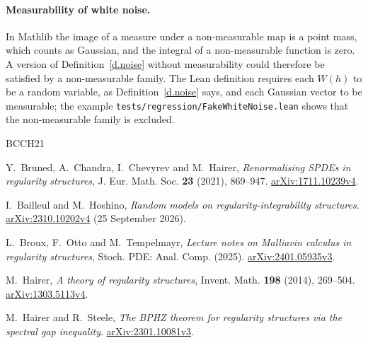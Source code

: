 \documentclass[11pt,letterpaper]{article}
\numberwithin{equation}{section}
\theoremstyle{plain}
\theoremstyle{definition}
\theoremstyle{remark}
\newcommand{\1}{\mathbf{1}}
\begin{document}
\paragraph{Measurability of white noise.} In Mathlib the image of a measure under a non-measurable map is a point mass, which counts as Gaussian, and the integral of a non-measurable function is zero. A version of Definition~\ref{d.noise} without measurability could therefore be satisfied by a non-measurable family. The Lean definition requires each $W(h)$ to be a random variable, as Definition~\ref{d.noise} says, and each Gaussian vector to be measurable; the example \texttt{tests/regression/FakeWhiteNoise.lean} shows that the non-measurable family is excluded.

\begin{thebibliography}{BCCH21}

 Y.~Bruned, A.~Chandra, I.~Chevyrev and M.~Hairer, \emph{Renormalising SPDEs in regularity structures}, J. Eur. Math. Soc. \textbf{23} (2021), 869--947. \href{https://arxiv.org/abs/1711.10239v4}{arXiv:1711.10239v4}.

 I.~Bailleul and M.~Hoshino, \emph{Random models on regularity-integrability structures}. \href{https://arxiv.org/abs/2310.10202v4}{arXiv:2310.10202v4} (25 September 2026).

 L.~Broux, F.~Otto and M.~Tempelmayr, \emph{Lecture notes on Malliavin calculus in regularity structures}, Stoch. PDE: Anal. Comp. (2025). \href{https://arxiv.org/abs/2401.05935v3}{arXiv:2401.05935v3}.

 M.~Hairer, \emph{A theory of regularity structures}, Invent. Math. \textbf{198} (2014), 269--504. \href{https://arxiv.org/abs/1303.5113v4}{arXiv:1303.5113v4}.

 M.~Hairer and R.~Steele, \emph{The BPHZ theorem for regularity structures via the spectral gap inequality}. \href{https://arxiv.org/abs/2301.10081v3}{arXiv:2301.10081v3}.

\end{thebibliography}
\end{document}
